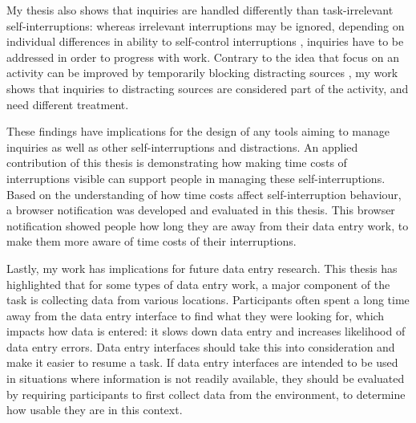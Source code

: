 My thesis also shows that inquiries are handled differently than task-irrelevant self-interruptions: whereas irrelevant interruptions may be ignored, depending on individual differences in ability to self-control interruptions \citep{Lyngs2018}, inquiries have to be addressed in order to progress with work. Contrary to the idea that focus on an activity can be improved by temporarily blocking distracting sources \citep{Kim2017}, my work shows that inquiries to distracting sources are considered part of the activity, and need different treatment. 

These findings have implications for the design of any tools aiming to manage inquiries as well as other self-interruptions and distractions. An applied contribution of this thesis is demonstrating how making time costs of interruptions visible can support people in managing these self-interruptions. Based on the understanding of how time costs affect self-interruption behaviour, a browser notification was developed and evaluated in this thesis. This browser notification showed people how long they are away from their data entry work, to make them more aware of time costs of their interruptions. %

Lastly, my work has implications for future data entry research. This thesis has highlighted that for some types of data entry work, a major component of the task is collecting data from various locations. Participants often spent a long time away from the data entry interface to find what they were looking for, which impacts how data is entered: it slows down data entry and increases likelihood of data entry errors. Data entry interfaces should take this into consideration and make it easier to resume a task. If data entry interfaces are intended to be used in situations where information is not readily available, they should be evaluated by requiring participants to first collect data from the environment, to determine how usable they are in this context. 


